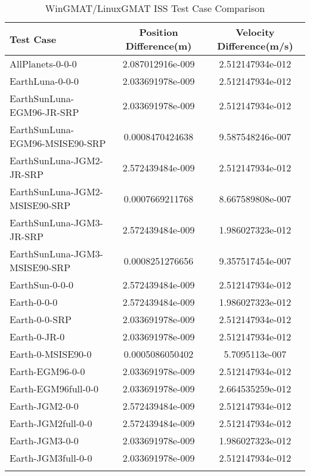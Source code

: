 \begin{table}[htbp!]
\centering
\caption{ WinGMAT/LinuxGMAT ISS Test Case Comparison}
      \begin{tabular}{lcc}
      \hline\hline
          Test Case & Position Difference(m) & Velocity Difference(m/s) \\
         \hline
         AllPlanets-0-0-0 & 2.087012916e-009 & 2.512147934e-012 \\
         EarthLuna-0-0-0 & 2.033691978e-009 & 2.512147934e-012 \\
         EarthSunLuna-EGM96-JR-SRP & 2.033691978e-009 & 2.512147934e-012 \\
         EarthSunLuna-EGM96-MSISE90-SRP & 0.0008470424638 & 9.587548246e-007 \\
         EarthSunLuna-JGM2-JR-SRP & 2.572439484e-009 & 2.512147934e-012 \\
         EarthSunLuna-JGM2-MSISE90-SRP & 0.0007669211768 & 8.667589808e-007 \\
         EarthSunLuna-JGM3-JR-SRP & 2.572439484e-009 & 1.986027323e-012 \\
         EarthSunLuna-JGM3-MSISE90-SRP & 0.0008251276656 & 9.357517454e-007 \\
         EarthSun-0-0-0 & 2.572439484e-009 & 2.512147934e-012 \\
         Earth-0-0-0 & 2.572439484e-009 & 1.986027323e-012 \\
         Earth-0-0-SRP & 2.033691978e-009 & 2.512147934e-012 \\
         Earth-0-JR-0 & 2.033691978e-009 & 2.512147934e-012 \\
         Earth-0-MSISE90-0 & 0.0005086050402 & 5.7095113e-007 \\
         Earth-EGM96-0-0 & 2.033691978e-009 & 2.512147934e-012 \\
         Earth-EGM96full-0-0 & 2.033691978e-009 & 2.664535259e-012 \\
         Earth-JGM2-0-0 & 2.572439484e-009 & 2.512147934e-012 \\
         Earth-JGM2full-0-0 & 2.572439484e-009 & 2.512147934e-012 \\
         Earth-JGM3-0-0 & 2.033691978e-009 & 1.986027323e-012 \\
         Earth-JGM3full-0-0 & 2.033691978e-009 & 2.512147934e-012 \\
      \hline\hline
      \label{Table: ISS WinGMAT-LinuxGMAT Table} 
\end{tabular}
\end{table}
